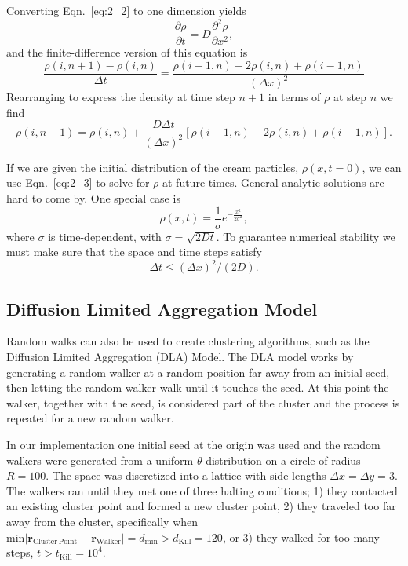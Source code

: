 \documentclass[notitlepage,aps,prd,nofootinbib]{revtex4-1}
\begin{document}
Converting Eqn.~\eqref{eq:2_2} to one dimension yields
\begin{equation}
	\frac{\partial\rho}{\partial t} = D\frac{\partial^{2}\rho}{\partial x^{2}},
\end{equation}
and the finite-difference version of this equation is 
\begin{equation}
	\frac{\rho(i, n+1) - \rho(i, n)}{\Delta t} = \frac{\rho(i+1, n) - 2\rho(i, n) + \rho(i-1, n)}{(\Delta x)^{2}}
\end{equation}
Rearranging to express the density at time step $n+1$ in terms of $\rho$ at step $n$ we find
\begin{equation} \label{eq:2_3}
	\rho(i, n+1) = \rho(i, n) + \frac{D\Delta t}{(\Delta x)^{2}}[\rho(i+1, n) - 2\rho(i, n) + \rho(i-1, n)]. 
\end{equation}

If we are given the initial distribution of the cream particles, $\rho(x, t=0)$, we can use Eqn.~\eqref{eq:2_3} to solve for $\rho$ at future times. General analytic solutions are hard to come by. One special case is 
\begin{equation}
	\rho(x, t) = \frac{1}{\sigma}e^{-\frac{x^{2}}{2\sigma^{2}}},
\end{equation}
where $\sigma$ is time-dependent, with $\sigma = \sqrt{2Dt}$. To guarantee numerical stability we must make sure that the space and time steps satisfy
\begin{equation} \label{eq:2_4}
	\Delta t \leq (\Delta x)^{2}/(2D).
\end{equation}

\subsection{Diffusion Limited Aggregation Model}
\label{subsec:theory_3}
Random walks can also be used to create clustering algorithms, such as the Diffusion Limited Aggregation (DLA) Model. The DLA model works by generating a random walker at a random position far away from an initial seed, then letting the random walker walk until it touches the seed. At this point the walker, together with the seed, is considered part of the cluster and the process is repeated for a new random walker.

In our implementation one initial seed at the origin was used and the random walkers were generated from a uniform $\theta$ distribution on a circle of radius $R = 100$. The space was discretized into a lattice with side lengths $\Delta x = \Delta y = 3$. The walkers ran until they met one of three halting conditions; 1) they contacted an existing cluster point and formed a new cluster point, 2) they traveled too far away from the cluster, specifically when $\mathrm{min}\left|\mathbf{r}_{\mathrm{Cluster\,Point}} - \mathbf{r}_{\mathrm{Walker}}\right| = d_{\mathrm{min}} > d_{\mathrm{Kill}} = 120$, or 3) they walked for too many steps, $t > t_{\mathrm{Kill}} = 10^{4}$.
\end{document}
